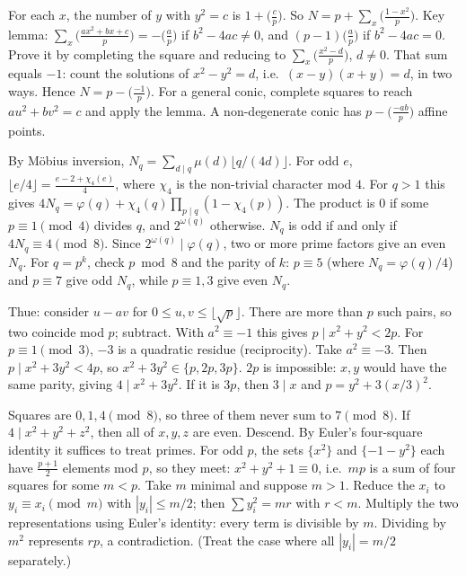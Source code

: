 \documentclass[11pt,a4paper]{article}
\begin{document}

 For each $x$, the number of $y$ with $y^2=c$ is $1+\bigl(\frac cp\bigr)$. So $N=p+\sum_x\bigl(\frac{1-x^2}p\bigr)$.
 Key lemma: $\sum_x\bigl(\frac{ax^2+bx+c}p\bigr)=-\bigl(\frac ap\bigr)$ if $b^2-4ac\ne0$, and $(p-1)\bigl(\frac ap\bigr)$ if $b^2-4ac=0$. Prove it by completing the square and reducing to $\sum_x\bigl(\frac{x^2-d}{p}\bigr)$, $d\ne0$. That sum equals $-1$: count the solutions of $x^2-y^2=d$, i.e.\ $(x-y)(x+y)=d$, in two ways.
 Hence $N=p-\bigl(\frac{-1}p\bigr)$. For a general conic, complete squares to reach $au^2+bv^2=c$ and apply the lemma. A non-degenerate conic has $p-\bigl(\frac{-ab}p\bigr)$ affine points.

 By M\"obius inversion, $N_q=\sum_{d\mid q}\mu(d)\lfloor q/(4d)\rfloor$. For odd $e$, $\lfloor e/4\rfloor=\frac{e-2+\chi_4(e)}4$, where $\chi_4$ is the non-trivial character mod $4$.
 For $q>1$ this gives $4N_q=\varphi(q)+\chi_4(q)\prod_{p\mid q}(1-\chi_4(p))$. The product is $0$ if some $p\equiv1\pmod 4$ divides $q$, and $2^{\omega(q)}$ otherwise.
 $N_q$ is odd if and only if $4N_q\equiv4\pmod 8$. Since $2^{\omega(q)}\mid\varphi(q)$, two or more prime factors give an even $N_q$. For $q=p^k$, check $p\bmod 8$ and the parity of $k$: $p\equiv5$ (where $N_q=\varphi(q)/4$) and $p\equiv7$ give odd $N_q$, while $p\equiv1,3$ give even $N_q$.

 Thue: consider $u-av$ for $0\le u,v\le\lfloor\sqrt p\rfloor$. There are more than $p$ such pairs, so two coincide mod $p$; subtract. With $a^2\equiv-1$ this gives $p\mid x^2+y^2<2p$.
 For $p\equiv1\pmod3$, $-3$ is a quadratic residue (reciprocity). Take $a^2\equiv-3$. Then $p\mid x^2+3y^2<4p$, so $x^2+3y^2\in\{p,2p,3p\}$.
 $2p$ is impossible: $x,y$ would have the same parity, giving $4\mid x^2+3y^2$. If it is $3p$, then $3\mid x$ and $p=y^2+3(x/3)^2$.

 Squares are $0,1,4\pmod8$, so three of them never sum to $7\pmod 8$. If $4\mid x^2+y^2+z^2$, then all of $x,y,z$ are even. Descend.
 By Euler's four-square identity it suffices to treat primes. For odd $p$, the sets $\{x^2\}$ and $\{-1-y^2\}$ each have $\frac{p+1}2$ elements mod $p$, so they meet: $x^2+y^2+1\equiv0$, i.e.\ $mp$ is a sum of four squares for some $m<p$.
 Take $m$ minimal and suppose $m>1$. Reduce the $x_i$ to $y_i\equiv x_i\pmod m$ with $|y_i|\le m/2$; then $\sum y_i^2=mr$ with $r<m$. Multiply the two representations using Euler's identity: every term is divisible by $m$. Dividing by $m^2$ represents $rp$, a contradiction. (Treat the case where all $|y_i|=m/2$ separately.)
\end{document}
